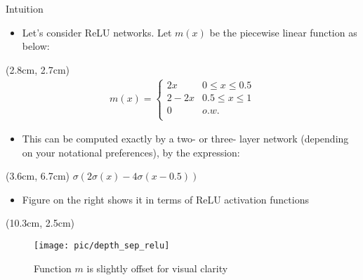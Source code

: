 \documentclass[serif, aspectratio=169]{beamer}
\begin{document}
\begin{frame}{Intuition}
	\begin{itemize}
		\item Let's consider ReLU networks. Let $m(x)$ be the \newline piecewise linear function as below: 
	\end{itemize}
	
	\begin{textblock*}{5cm}(2.8cm, 2.7cm)
		$$		
		\begin{aligned}
			m(x) = 
			\begin{cases}
				2x & 0 \le x \le 0.5\\
				2-2x & 0.5 \le x \le 1\\
				0 & o.w.\\
			\end{cases}
		\end{aligned}
		$$
	\end{textblock*}
	
	\vspace{2cm}
	\begin{itemize}
		\item This can be computed exactly by a two- or three- \newline layer network (depending on your notational \newline preferences), by the expression:
	\end{itemize}

	\begin{textblock*}{5cm}(3.6cm, 6.7cm)
		$\sigma (2 \sigma(x) - 4 \sigma(x - 0.5))$
	\end{textblock*}
	
	\vspace{0.5cm}
	\begin{itemize}
		\item Figure on the right shows it in terms of ReLU \newline activation functions
	\end{itemize}

	\begin{textblock*}{5cm}(10.3cm, 2.5cm)
		\begin{center}
			\begin{figure}
				\texttt{[image: pic/depth\_sep\_relu]}
				\caption*{\tiny \hspace{1em} Function $m$ is slightly offset for visual clarity}
			\end{figure}
		\end{center}
	\end{textblock*}

\end{frame}
\end{document}
